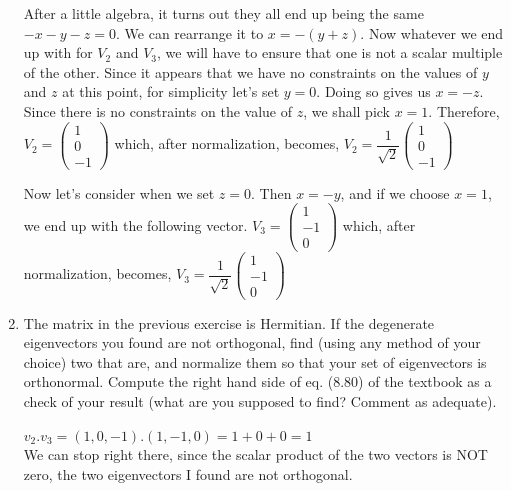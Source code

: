 \documentclass[fleqn]{article}
\begin{document}
\begin{enumerate}
      \textcolor{hwColor}{
        After a little algebra, it turns out they all end up being the same $-x-y-z=0$. We can rearrange it to $x=-(y+z)$. Now whatever we end up with for $V_2$ and $V_3$,
        we will have to ensure that one is not a scalar multiple of the other. Since it appears that we have no constraints on the values of $y$ and $z$ at this point, for simplicity let's set $y=0$.
        Doing so gives us $x=-z$. Since there is no constraints on the value of $z$, we shall pick $x=1$. Therefore,       
        $
        V_2=\begin{pmatrix}
          1 \\
          0 \\
          -1
        \end{pmatrix}
        $
        which, after normalization, becomes, $V_2=\dfrac{1}{\sqrt{2}} \begin{pmatrix}
          1 \\
          0 \\
          -1
        \end{pmatrix}
        $
      }

      \textcolor{hwColor}{
        Now let's consider when we set $z=0$. Then $x=-y$, and if we choose $x=1$, we end up with the following vector.       
        $
        V_3=\begin{pmatrix}
          1 \\
          -1 \\
          0
        \end{pmatrix}
        $
        which, after normalization, becomes, $V_3=\dfrac{1}{\sqrt{2}} \begin{pmatrix}
          1 \\
          -1 \\
          0
        \end{pmatrix}
        $
      }

    \item The matrix in the previous exercise is Hermitian. If the degenerate eigenvectors you found are not orthogonal, find (using any method of your choice) two that are, and normalize them so that your set of eigenvectors is orthonormal.
      Compute the right hand side of eq. (8.80) of the textbook as a check of your result (what are you supposed to find? Comment as adequate).

      \textcolor{hwColor}{
        $v_2.v_3=(1,0,-1).(1,-1,0)=1+0+0=1$ \\
        We can stop right there, since the scalar product of the two vectors is NOT zero, the two eigenvectors I found are not orthogonal. 
      }


\end{enumerate}
\end{document}

